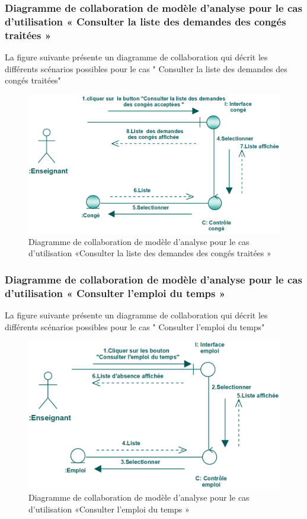 \documentclass[12 pt]{report}
\begin{document}
\subsubsection{Diagramme  de  collaboration  de  modèle  d'analyse  pour  le  cas  d'utilisation « Consulter la liste des demandes des congés traitées »  }
La figure suivante présente un diagramme de collaboration qui décrit les différents
scénarios possibles pour le cas " Consulter la liste des demandes des congés traitées"
\begin{figure}[h]
\begin{center}
\includegraphics[width= 14cm , height =5 cm]{collaconscon.PNG}
 \caption{Diagramme  de  collaboration  de  modèle  d'analyse  pour  le  cas  d'utilisation «Consulter la liste des demandes des congés traitées »}
\end{center}
\end{figure}
\subsubsection{Diagramme  de  collaboration  de  modèle  d'analyse  pour  le  cas  d'utilisation « Consulter l'emploi du temps »  }
La figure suivante présente un diagramme de collaboration qui décrit les différents
scénarios possibles pour le cas " Consulter l'emploi du temps"
\begin{figure}[h]
\begin{center}
\includegraphics[width= 14cm , height =5 cm]{colla_ens_consulteremploi.PNG}
 \caption{Diagramme  de  collaboration  de  modèle  d'analyse  pour  le  cas  d'utilisation «Consulter l'emploi du temps »}
\end{center}
\end{figure}
\end{document}
